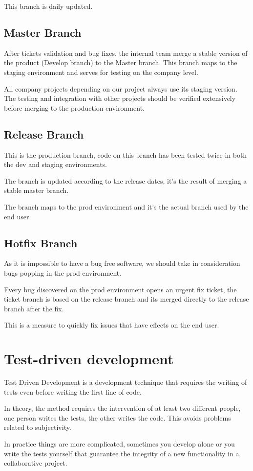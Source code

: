 \begin{spacing}{1.2}
This branch is daily updated. 
\subsection{Master Branch}
After tickets validation and bug fixes, the internal team merge a stable version of the product (Develop branch) to the Master branch. This branch maps to the staging environment and serves for testing on the company level. 

All company projects depending on our project always use its staging version. The testing and integration with other projects should be verified extensively before merging to the production environment. 


\subsection{Release Branch}
This is the production branch, code on this branch has been tested twice in both the dev and staging environments.

The branch is updated according to the release dates, it's the result of merging a stable master branch.

The branch maps to the prod environment and it's the actual branch used by the end user.
\subsection{Hotfix Branch}
As it is impossible to have a bug free software, we should take in consideration bugs popping in the prod environment.

Every bug discovered on the prod environment opens an urgent fix ticket, the ticket branch is based on the release branch and its merged directly to the release branch after the fix.

This is a measure to quickly fix issues that have effects on the end user.
\section{Test-driven development}
Test Driven Development is a development technique that requires the writing of tests even before writing the first line of code.

In theory, the method requires the intervention of at least two different people, one person writes the tests, the other writes the code. This avoids problems related to subjectivity.

In practice things are more complicated, sometimes you develop alone or you write the tests yourself that guarantee the integrity of a new functionality in a collaborative project.


\end{spacing}
